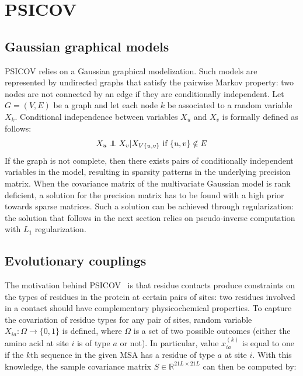 \section{PSICOV}

    \subsection{Gaussian graphical models}

        PSICOV relies on a Gaussian graphical modelization. Such models are represented by undirected graphs that
        satisfy the pairwise Markov property: two nodes are not connected by an edge if they are conditionally independent.
        Let $G = (V, E)$ be a graph and let each node $k$ be associated to a random variable $X_k$.
        Conditional independence between variables $X_u$ and $X_v$ is formally defined as follows:
        \begin{equation}
            X_u \independent X_v \vert X_{V \\ \{u, v\}} \, \, \text{if } \{u, v\} \notin E
        \end{equation}
        If the graph is not complete, then there exists pairs of conditionally independent variables in the model,
        resulting in sparsity patterns in the underlying precision matrix.
        When the covariance matrix of the multivariate Gaussian model is rank deficient, a solution for the precision
        matrix has to be found with a high prior towards sparse matrices. Such a solution can be achieved through
        regularization: the solution that follows in the next section relies on pseudo-inverse computation
        with $L_1$ regularization.

    \subsection{Evolutionary couplings} \label{graphicalmodels}

        The motivation behind PSICOV~\cite{doi:10.1093/bioinformatics/btr638} is that residue contacts produce constraints on the types of residues in the
        protein at certain pairs of sites: two residues involved in a contact should have complementary physicochemical properties.
        To capture the covariation
        of residue types for any pair of sites, random variable $X_{ia}: \Omega \rightarrow \{0, 1\}$ is defined,
        where $\Omega$ is a set of two possible outcomes (either the amino acid at site $i$ is of type $a$ or not).
        In particular, value $x_{ia}^{(k)}$ is equal to one if the $k$th sequence in the given MSA has a residue of type $a$
        at site $i$. With this knowledge, the sample covariance matrix $S \in \mathbb{R}^{21 L \times 21 L}$ can then be computed by:

